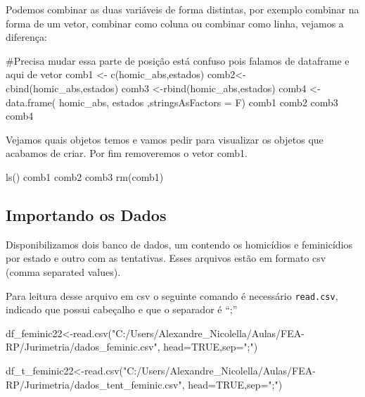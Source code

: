 \documentclass[
  letterpaper,
  DIV=11,
  numbers=noendperiod]{scrreprt}
\newenvironment{Shaded}{\begin{snugshade}}{\end{snugshade}}
\newcommand{\AttributeTok}[1]{\textcolor[rgb]{0.40,0.45,0.13}{#1}}
\newcommand{\CommentTok}[1]{\textcolor[rgb]{0.37,0.37,0.37}{#1}}
\newcommand{\ConstantTok}[1]{\textcolor[rgb]{0.56,0.35,0.01}{#1}}
\newcommand{\FunctionTok}[1]{\textcolor[rgb]{0.28,0.35,0.67}{#1}}
\newcommand{\NormalTok}[1]{\textcolor[rgb]{0.00,0.23,0.31}{#1}}
\newcommand{\OtherTok}[1]{\textcolor[rgb]{0.00,0.23,0.31}{#1}}
\newcommand{\StringTok}[1]{\textcolor[rgb]{0.13,0.47,0.30}{#1}}
\begin{document}
Podemos combinar as duas variáveis de forma distintas, por exemplo
combinar na forma de um vetor, combinar como coluna ou combinar como
linha, vejamos a diferença:

\begin{Shaded}
\begin{Highlighting}[]
\CommentTok{\#Precisa mudar essa parte de posição está confuso pois falamos de dataframe e aqui de vetor}
\NormalTok{comb1 }\OtherTok{\textless{}{-}} \FunctionTok{c}\NormalTok{(homic\_abs,estados)      }
\NormalTok{comb2}\OtherTok{\textless{}{-}} \FunctionTok{cbind}\NormalTok{(homic\_abs,estados)}
\NormalTok{comb3 }\OtherTok{\textless{}{-}}\FunctionTok{rbind}\NormalTok{(homic\_abs,estados)}
\NormalTok{comb4 }\OtherTok{\textless{}{-}} \FunctionTok{data.frame}\NormalTok{(}
\NormalTok{              homic\_abs,}
\NormalTok{              estados}
\NormalTok{              ,}\AttributeTok{stringsAsFactors =}\NormalTok{ F)}
\NormalTok{comb1}
\NormalTok{comb2 }
\NormalTok{comb3}
\NormalTok{comb4}
\end{Highlighting}
\end{Shaded}

Vejamos quais objetos temos e vamos pedir para visualizar os objetos que
acabamos de criar. Por fim removeremos o vetor comb1.

\begin{Shaded}
\begin{Highlighting}[]
\FunctionTok{ls}\NormalTok{()  }
\NormalTok{comb1}
\NormalTok{comb2}
\NormalTok{comb3}
\FunctionTok{rm}\NormalTok{(comb1)              }
\end{Highlighting}
\end{Shaded}

\subsection{Importando os Dados}\label{importando-os-dados}

Disponibilizamos dois banco de dados, um contendo os homicídios e
feminicídios por estado e outro com as tentativas. Esses arquivos estão
em formato csv (comma separated values).

Para leitura desse arquivo em csv o seguinte comando é necessário
\texttt{read.csv}, indicado que possui cabeçalho e que o separador é
``;''

\begin{Shaded}
\begin{Highlighting}[]
\NormalTok{df\_feminic22}\OtherTok{\textless{}{-}}\FunctionTok{read.csv}\NormalTok{(}\StringTok{"C:/Users/Alexandre\_Nicolella/Aulas/FEA{-}RP/Jurimetria/dados\_feminic.csv"}\NormalTok{, }\AttributeTok{head=}\ConstantTok{TRUE}\NormalTok{,}\AttributeTok{sep=}\StringTok{";"}\NormalTok{)}

\NormalTok{df\_t\_feminic22}\OtherTok{\textless{}{-}}\FunctionTok{read.csv}\NormalTok{(}\StringTok{"C:/Users/Alexandre\_Nicolella/Aulas/FEA{-}RP/Jurimetria/dados\_tent\_feminic.csv"}\NormalTok{, }\AttributeTok{head=}\ConstantTok{TRUE}\NormalTok{,}\AttributeTok{sep=}\StringTok{";"}\NormalTok{)}
\end{Highlighting}
\end{Shaded}
\end{document}

